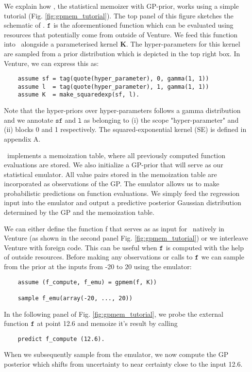We explain how \gpmem, the statistical memoizer with \ac{GP}-prior, works using a simple tutorial
(Fig. \ref{fig:gpmem_tutorial}). 
The top panel of this figure sketches the schematic of \gpmem.
$\texttt{f}$ is the aforementioned function which can be evaluated using resources that potentially come
from outside of Venture.  
We feed this function into \gpmem\ alongside
a parameterised kernel $\mathbf{K}$. The hyper-parameters for this kernel are sampled from a 
prior distribution which is depicted in the top right box. In Venture, we can express this as:
    \begin{lstlisting}
    assume sf = tag(quote(hyper_parameter), 0, gamma(1, 1))
    assume l  = tag(quote(hyper_parameter), 1, gamma(1, 1))
    assume K  = make_squaredexp(sf, l).
    \end{lstlisting}
Note that the hyper-priors over hyper-parameters follows a gamma distribution and we annotate $\texttt{sf}$ and $\texttt{l}$
as belonging to (i) the scope "hyper-parameter" and (ii) blocks 0 and 1 respectively.
The squared-exponential kernel (SE) is defined in appendix A.

\gpmem\ implements a memoization table, where all previously
computed function evaluations are stored. We also initialize a \ac{GP}-prior that
will serve as our statistical emulator.
All value pairs stored in the memoization table are incorporated as observations of
the \ac{GP}.
The emulator allows us to make probabilistic predictions on function evaluations.
We simply feed the regression input
into the emulator and output a predictive posterior Gaussian distribution determined by the \ac{GP} and
the memoization table.

We can either define the function f that serves as as input for \gpmem\
 natively in Venture
(as shown in the second panel Fig. \ref{fig:gpmem_tutorial}) or we interleave Venture with foreign code. 
This can be useful when $\texttt{f}$ is computed with the help of outside resources.
Before making any observations or calls to $\texttt{f}$
we can sample from the prior at the inputs from -20 to 20 using the emulator:
    \begin{lstlisting}
    assume (f_compute, f_emu) = gpmem(f, K))

    sample f_emu(array(-20, ..., 20))
    \end{lstlisting}
In the following panel of Fig. \ref{fig:gpmem_tutorial}, we probe the external function $\texttt{f}$ at point 12.6 and memoize it's result by calling 
   \begin{lstlisting}
    predict f_compute (12.6).
    \end{lstlisting}
When we subsequently sample from the emulator, we now compute the \ac{GP} posterior which shifts from uncertainty to near certainty close to the input 12.6.

